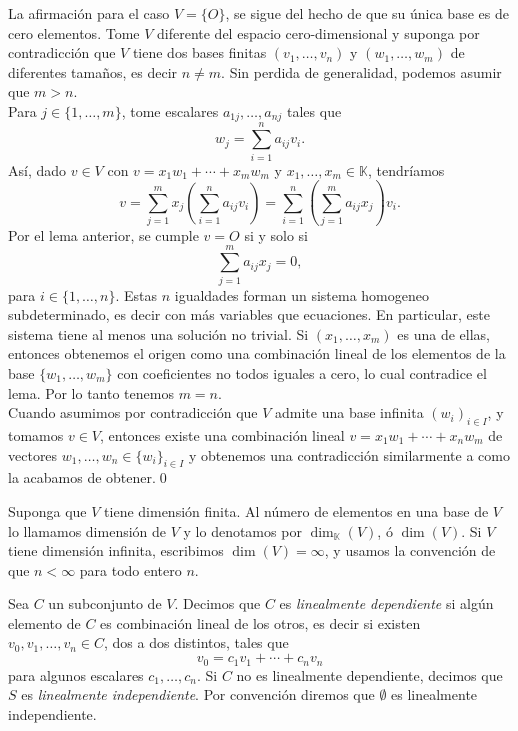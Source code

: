 \dem La afirmaci\'on para el caso $V=\{O\}$, se sigue del hecho de que su \'unica base es de cero elementos. Tome $V$ diferente del espacio cero-dimensional y suponga por contradicci\'on que $V$ tiene dos bases finitas $(v_1,\ldots, v_n)$ y $(w_1,\ldots, w_m)$ de diferentes tamaños, es decir $n\ne m$. Sin perdida de generalidad, podemos asumir que $m>n$.\\
Para $j\in\{1,\ldots,m\}$, tome escalares $a_{1j},\ldots,a_{nj}$ tales que $$w_j=\sum_{i=1}^n a_{ij}v_i.$$ As\'i, dado $v\in V$ con $v=x_1w_1+\cdots+x_mw_m$ y $x_1,\ldots,x_m\in\mathbb{K}$, tendr\'iamos
$$v = \sum_{j=1}^m x_j\left(\sum_{i=1}^n a_{ij}v_i\right) = \sum_{i=1}^n\left(\sum_{j=1}^m a_{ij}x_j\right)v_i.$$
Por el lema anterior, se cumple $v=O$ si y solo si
\[
\sum_{j=1}^m a_{ij}x_j=0,
\]
para $i\in\{1,\ldots,n\}$. Estas $n$ igualdades forman un sistema homogeneo subdeterminado, es decir con m\'as variables que ecuaciones. En particular, este sistema tiene al menos una solución no trivial. Si $(x_1,\ldots,x_m)$ es una de ellas, entonces obtenemos el origen como una combinaci\'on lineal de los elementos de la base $\{w_1,\ldots, w_m\}$ con coeficientes no todos iguales a cero, lo cual contradice el lema. Por lo tanto tenemos $m=n$.\\
Cuando asumimos por contradicción que $V$ admite una base infinita $(w_i)_{i\in I}$, y tomamos $v\in V$, entonces existe una combinación lineal $v=x_1w_1+\cdots+x_nw_m$ de vectores $w_1,\ldots,w_n\in\{w_i\}_{i\in I}$ y obtenemos una contradicción similarmente a como la acabamos de obtener.\qed

\begin{defn}
Suponga que $V$ tiene dimensi\'on finita. Al n\'umero de elementos en una base de $V$ lo llamamos dimensi\'on de $V$ y lo denotamos por $\dim_\mathbb{K}(V)$, ó $\dim (V)$. Si $V$ tiene dimensi\'on infinita, escribimos $\dim(V)=\infty$, y usamos la convenci\'on de que $n<\infty$ para todo entero $n$.
\end{defn}

\begin{defn}
Sea $C$ un subconjunto de $V$. Decimos que $C$ es \emph{linealmente dependiente} si alg\'un elemento de $C$ es combinaci\'on lineal de los otros, es decir si existen $v_0,v_1,\ldots,v_n\in C$, dos a dos distintos, tales que
\[
v_0=c_1v_1+\cdots+c_nv_n
\]
para algunos escalares $c_1,\ldots,c_n$. Si $C$ no es linealmente dependiente, decimos que $S$ es \emph{linealmente independiente}. Por convención diremos que $\emptyset$ es linealmente independiente.
\end{defn}

